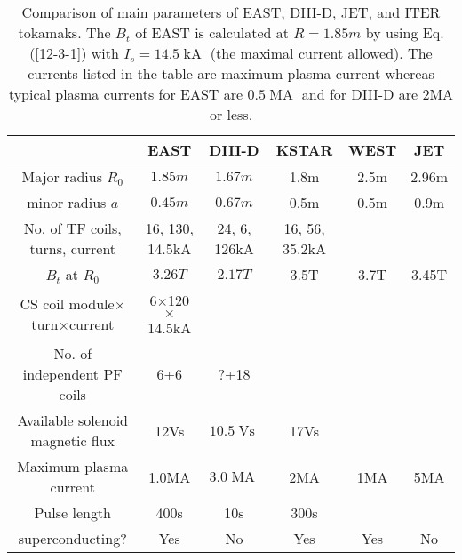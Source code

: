 \documentclass{article}
\newcommand{\tmop}[1]{\ensuremath{\operatorname{#1}}}
\begin{document}
\begin{table}[h]
  \begin{tabular}{|c|c|c|c|c|c|}
    \hline
    & EAST & DIII-D{\cite{Luxon2002}} & KSTAR{\cite{Lee2001}} & WEST & JET\\
    \hline
    Major radius $R_0$ & $1.85 m$ & $1.67 m$ & 1.8m & 2.5m & 2.96m\\
    \hline
    minor radius $a$ & $0.45 m$ & $0.67 m$ & 0.5m & 0.5m & 0.9m\\
    \hline
    No. of TF coils, turns, current & 16, 130, 14.5kA & 24, 6, 126kA & 16, 56,
    35.2kA &  & \\
    \hline
    $B_t$ at $R_0$ & $3.26 T$ & $2.17 T$ & 3.5T & 3.7T & 3.45T\\
    \hline
    CS coil module$\times$turn$\times$current & 6$\times$120$\times$14.5kA & 
    &  &  & \\
    \hline
    No. of independent PF coils & 6+6 & ?+18 &  &  & \\
    \hline
    Available solenoid magnetic flux & 12Vs & $10.5 \tmop{Vs}$ & 17Vs &  & \\
    \hline
    Maximum plasma current & 1.0MA & $3.0 \tmop{MA}$ & 2MA & 1MA & 5MA\\
    \hline
    Pulse length & 400s & 10s & 300s &  & \\
    \hline
    superconducting? & Yes & No & Yes & Yes & No\\
    \hline
  \end{tabular}
  
  \
  \caption{\label{12-3-2}Comparison of main parameters of EAST, DIII-D, JET,
  and ITER tokamaks. The $B_t$ of EAST is calculated at $R = 1.85 m$ by using
  Eq. (\ref{12-3-1}) with $I_s = 14.5 \tmop{kA}$ (the maximal current
  allowed). The currents listed in the table are maximum plasma current
  whereas typical plasma currents for EAST are $0.5 \tmop{MA}$ and for DIII-D
  are 2MA or less.}
\end{table}
\end{document}
